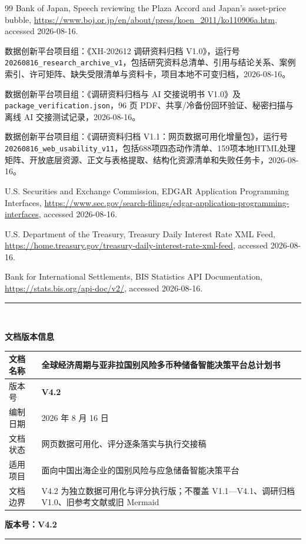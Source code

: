 \documentclass[UTF8,fontset=windows,12pt,openany]{ctexbook}
\newcommand{\Field}[1]{{\small\nolinkurl{#1}}}
\newcommand{\File}[1]{{\small\begingroup\urlstyle{same}\nolinkurl{#1}\endgroup}}
\begin{document}
\begin{thebibliography}{99}
Bank of Japan, Speech reviewing the Plaza Accord and Japan's asset-price bubble, \url{https://www.boj.or.jp/en/about/press/koen_2011/ko110906a.htm}, accessed 2026-08-16.

数据创新平台项目组：《XH-202612 调研资料归档 V1.0》，运行号 \Field{20260816_research_archive_v1}，包括研究资料总清单、引用与结论关系、案例索引、许可矩阵、缺失受限清单与资料卡，项目本地不可变归档，2026-08-16。

数据创新平台项目组：《调研资料归档与 AI 交接说明书 V1.0》及 \File{package_verification.json}，96 页 PDF、共享/冷备份回环验证、秘密扫描与离线 AI 交接测试记录，2026-08-16。

数据创新平台项目组：《调研资料归档 V1.1：网页数据可用化增量包》，运行号 \Field{20260816_web_usability_v11}，包括688项四态动作清单、159项本地HTML处理矩阵、开放底层资源、正文与表格提取、结构化资源清单和失败任务卡，2026-08-16。

U.S. Securities and Exchange Commission, EDGAR Application Programming Interfaces, \url{https://www.sec.gov/search-filings/edgar-application-programming-interfaces}, accessed 2026-08-16.

U.S. Department of the Treasury, Treasury Daily Interest Rate XML Feed, \url{https://home.treasury.gov/treasury-daily-interest-rate-xml-feed}, accessed 2026-08-16.

Bank for International Settlements, BIS Statistics API Documentation, \url{https://stats.bis.org/api-doc/v2/}, accessed 2026-08-16.

\end{thebibliography}

\clearpage
\thispagestyle{empty}
\begin{center}
  \vspace*{3.2cm}
  {\color{OceanBlue}\rule{0.82\textwidth}{1.4pt}}\\[1.2cm]
  {\Huge\bfseries\color{DeepNavy}文档版本信息\par}
  \vspace{1.4cm}
  \begin{tabular}{p{4.2cm}p{8.0cm}}
    \toprule
    文档名称 & 全球经济周期与亚非拉国别风险多币种储备智能决策平台总计划书\\
    \midrule
    版本号 & \textbf{V4.2}\\
    编制日期 & 2026 年 8 月 16 日\\
    文档状态 & 网页数据可用化、评分逐条落实与执行交接稿\\
    适用项目 & 面向中国出海企业的国别风险与应急储备智能决策平台\\
    文档边界 & V4.2 为独立数据可用化与评分执行版；不覆盖 V1.1—V4.1、调研归档 V1.0、旧参考文献或旧 Mermaid\\
    \bottomrule
  \end{tabular}
  \vfill
  {\Large\bfseries\color{DeepNavy}版本号：V4.2\par}
  \vspace{1.0cm}
  {\color{OceanBlue}\rule{0.82\textwidth}{1.4pt}}
\end{center}
\end{document}
